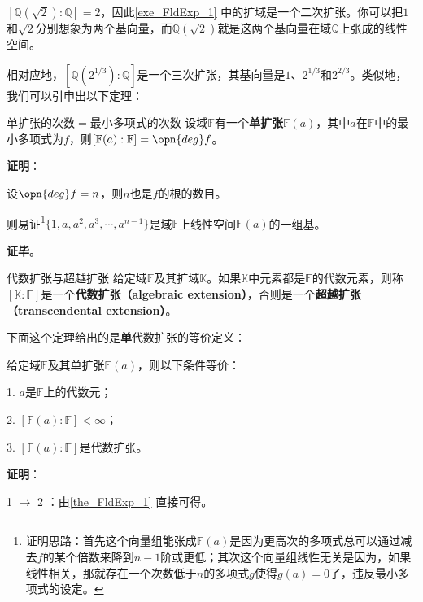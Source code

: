 $[\mathbb{Q}(\sqrt{2}):\mathbb{Q}]=2$，因此\autoref{exe_FldExp_1} 中的扩域是一个二次扩张。你可以把$1$和$\sqrt{2}$分别想象为两个基向量，而$\mathbb{Q}(\sqrt{2})$就是这两个基向量在域$\mathbb{Q}$上张成的线性空间。

相对应地，$[\mathbb{Q}(2^{1/3}):\mathbb{Q}]$是一个三次扩张，其基向量是$1$、$2^{1/3}$和$2^{2/3}$。类似地，我们可以引申出以下定理：




\begin{theorem}{单扩张的次数$=$最小多项式的次数}\label{the_FldExp_1}
设域$\mathbb{F}$有一个\textbf{单扩张}$\mathbb{F}(a)$，其中$a$在$\mathbb{F}$中的最小多项式为$f$，则$[\mathbb{F}(a):\mathbb{F}]=\opn{deg}f$。
\end{theorem}

\textbf{证明}：

设$\opn{deg}f=n$，则$n$也是$f$的根的数目。

则易证\footnote{证明思路：首先这个向量组能张成$\mathbb{F}(a)$是因为更高次的多项式总可以通过减去$f$的某个倍数来降到$n-1$阶或更低；其次这个向量组线性无关是因为，如果线性相关，那就存在一个次数低于$n$的多项式$g$使得$g(a)=0$了，违反最小多项式的设定。}$\{1, a, a^2, a^3, \cdots, a^{n-1}\}$是域$\mathbb{F}$上线性空间$\mathbb{F}(a)$的一组基。

\textbf{证毕}。




\begin{definition}{代数扩张与超越扩张}\label{def_FldExp_3}
给定域$\mathbb{F}$及其扩域$\mathbb{K}$。如果$\mathbb{K}$中元素都是$\mathbb{F}$的代数元素，则称$[\mathbb{K}:\mathbb{F}]$是一个\textbf{代数扩张（algebraic extension）}，否则是一个\textbf{超越扩张（transcendental extension）}。
\end{definition}

下面这个定理给出的是\textbf{单}代数扩张的等价定义：

\begin{theorem}{}\label{the_FldExp_2}
给定域$\mathbb{F}$及其单扩张$\mathbb{F}(a)$，则以下条件等价：

1. $a$是$\mathbb{F}$上的代数元；

2. $[\mathbb{F}(a):\mathbb{F}]<\infty$；

3. $[\mathbb{F}(a):\mathbb{F}]$是代数扩张。

\end{theorem}


\textbf{证明}：

1 $\to$ 2 ：由\autoref{the_FldExp_1} 直接可得。

